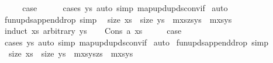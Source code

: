 \begin{isabellebody}
\ \ \isamarkupfalse%
\ \isamarkupfalse%
\ {\isacharquery}{\kern0pt}case\isanewline
\ \ \ \ \isamarkupfalse%
\ {\isacharparenleft}{\kern0pt}cases\ ys{\isacharparenright}{\kern0pt}\ {\isacharparenleft}{\kern0pt}auto\ simp{\isacharcolon}{\kern0pt}\ map{\isacharunderscore}{\kern0pt}upd{\isacharunderscore}{\kern0pt}upds{\isacharunderscore}{\kern0pt}conv{\isacharunderscore}{\kern0pt}if{\isacharparenright}{\kern0pt}\isanewline
{}\isamarkupfalse%
\ auto%
\endisatagproof
{\isafoldproof}%
%
\isadelimproof
\isanewline
%
\endisadelimproof
\isanewline
{}\isamarkupfalse%
\ fun{\isacharunderscore}{\kern0pt}upds{\isacharunderscore}{\kern0pt}append{\isacharunderscore}{\kern0pt}drop\ {\isacharbrackleft}{\kern0pt}simp{\isacharbrackright}{\kern0pt}{\isacharcolon}{\kern0pt}\isanewline
\ \ {\isachardoublequoteopen}size\ xs\ {\isacharequal}{\kern0pt}\ size\ ys\ {\isasymLongrightarrow}\ m{\isacharparenleft}{\kern0pt}xs{\isacharat}{\kern0pt}zs{\isacharbrackleft}{\kern0pt}{\isasymmapsto}{\isacharbrackright}{\kern0pt}ys{\isacharparenright}{\kern0pt}\ {\isacharequal}{\kern0pt}\ m{\isacharparenleft}{\kern0pt}xs{\isacharbrackleft}{\kern0pt}{\isasymmapsto}{\isacharbrackright}{\kern0pt}ys{\isacharparenright}{\kern0pt}{\isachardoublequoteclose}\isanewline
%
\isadelimproof
%
\endisadelimproof
%
\isatagproof
{}\isamarkupfalse%
\ {\isacharparenleft}{\kern0pt}induct\ xs\ arbitrary{\isacharcolon}{\kern0pt}\ ys{\isacharparenright}{\kern0pt}\isanewline
\ \ \isamarkupfalse%
\ {\isacharparenleft}{\kern0pt}Cons\ a\ xs{\isacharparenright}{\kern0pt}\isanewline
\ \ \isamarkupfalse%
\ \isamarkupfalse%
\ {\isacharquery}{\kern0pt}case\isanewline
\ \ \ \ \isamarkupfalse%
\ {\isacharparenleft}{\kern0pt}cases\ ys{\isacharparenright}{\kern0pt}\ {\isacharparenleft}{\kern0pt}auto\ simp{\isacharcolon}{\kern0pt}\ map{\isacharunderscore}{\kern0pt}upd{\isacharunderscore}{\kern0pt}upds{\isacharunderscore}{\kern0pt}conv{\isacharunderscore}{\kern0pt}if{\isacharparenright}{\kern0pt}\isanewline
{}\isamarkupfalse%
\ auto%
\endisatagproof
{\isafoldproof}%
%
\isadelimproof
\isanewline
%
\endisadelimproof
\isanewline
{}\isamarkupfalse%
\ fun{\isacharunderscore}{\kern0pt}upds{\isacharunderscore}{\kern0pt}append{}{\isacharunderscore}{\kern0pt}drop\ {\isacharbrackleft}{\kern0pt}simp{\isacharbrackright}{\kern0pt}{\isacharcolon}{\kern0pt}\isanewline
\ \ {\isachardoublequoteopen}size\ xs\ {\isacharequal}{\kern0pt}\ size\ ys\ {\isasymLongrightarrow}\ m{\isacharparenleft}{\kern0pt}xs{\isacharbrackleft}{\kern0pt}{\isasymmapsto}{\isacharbrackright}{\kern0pt}ys{\isacharat}{\kern0pt}zs{\isacharparenright}{\kern0pt}\ {\isacharequal}{\kern0pt}\ m{\isacharparenleft}{\kern0pt}xs{\isacharbrackleft}{\kern0pt}{\isasymmapsto}{\isacharbrackright}{\kern0pt}ys{\isacharparenright}{\kern0pt}{\isachardoublequoteclose}\isanewline

\end{isabellebody}

